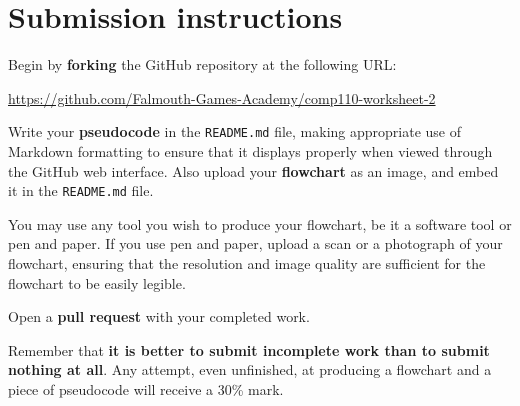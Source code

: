 \documentclass{../../../fal_assignment}
\begin{document}
\section*{Submission instructions}

Begin by \textbf{forking} the GitHub repository at the following URL:

\url{https://github.com/Falmouth-Games-Academy/comp110-worksheet-2}

Write your \textbf{pseudocode} in the \texttt{README.md} file,
making appropriate use of Markdown formatting to ensure that it displays properly when viewed through the GitHub web interface.
Also upload your \textbf{flowchart} as an image, and embed it in the \texttt{README.md} file.

You may use any tool you wish to produce your flowchart,
be it a software tool or pen and paper.
If you use pen and paper, upload a scan or a photograph of your flowchart,
ensuring that the resolution and image quality are sufficient for the flowchart to be easily legible.

Open a \textbf{pull request} with your completed work.

Remember that \textbf{it is better to submit incomplete work than to submit nothing at all}.
Any attempt, even unfinished, at producing a flowchart and a piece of pseudocode will receive a 30\% mark.
\end{document}
